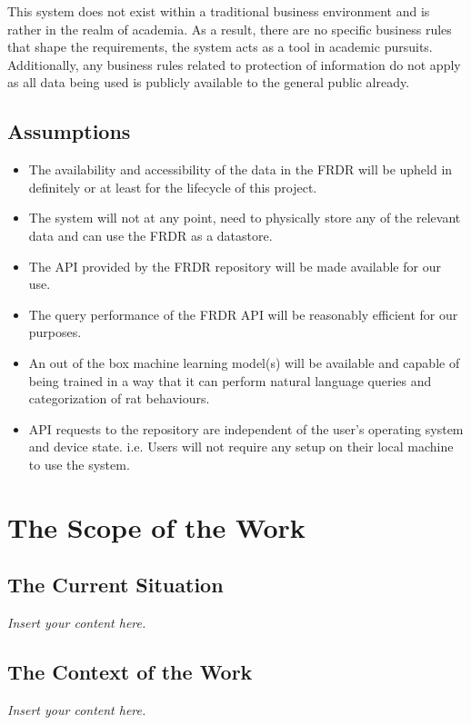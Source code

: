 \documentclass[12pt]{article}
\newcommand{\lips}{\textit{Insert your content here.}}
\begin{document}
    \par{This system does not exist within a traditional business environment and is
    rather in the realm of academia. As a result, there are no specific business rules that shape
    the requirements, the system acts as a tool in academic pursuits. Additionally, any business rules
    related to protection of information do not apply as all data being used is publicly available to
    the general public already. }

\subsection{Assumptions}

\begin{itemize}
    \item The availability and accessibility of the data in the FRDR will be upheld in definitely or at least for the lifecycle of this project.
    \item The system will not at any point, need to physically store any of the relevant data and can use the FRDR as a datastore.
    \item The API provided by the FRDR repository will be made available for our use.
    \item The query performance of the FRDR API will be reasonably efficient for our purposes.
    \item An out of the box machine learning model(s) will be available and capable of being trained in a way that it can
    perform natural language queries and categorization of rat behaviours. 
    \item API requests to the repository are independent of the user's operating system and device state. i.e. Users
    will not require any setup on their local machine to use the system.

\end{itemize}


\section{The Scope of the Work}
\subsection{The Current Situation}
\lips
\subsection{The Context of the Work}
\lips
\end{document}
